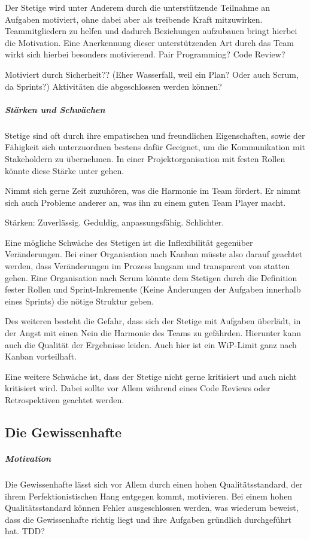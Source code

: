 \documentclass[twocolumn,10pt]{asme2ej}
\begin{document}
Der Stetige wird unter Anderem durch die unterstützende Teilnahme an Aufgaben motiviert, ohne dabei aber als treibende Kraft mitzuwirken. Teammitgliedern zu helfen und dadurch Beziehungen aufzubauen bringt hierbei die Motivation. Eine Anerkennung dieser unterstützenden Art durch das Team wirkt sich hierbei besonders motivierend. Pair Programming? Code Review?	
 

Motiviert durch  Sicherheit?? (Eher Wasserfall, weil ein Plan? Oder auch Scrum, da Sprints?)
Aktivitäten die abgeschlossen werden können? 

\subparagraph{Stärken und Schwächen}

Stetige sind oft durch ihre empatischen und freundlichen Eigenschaften, sowie der Fähigkeit sich unterzuordnen bestens dafür Geeignet, um die Kommunikation mit Stakeholdern zu übernehmen. In einer Projektorganisation mit festen Rollen könnte diese Stärke unter gehen.

Nimmt sich gerne Zeit zuzuhören, was die Harmonie im Team fördert. Er nimmt sich auch Probleme anderer an, was ihn zu einem guten Team Player macht.

Stärken: Zuverlässig. Geduldig, anpassungsfähig. Schlichter. 

Eine mögliche Schwäche des Stetigen ist die Inflexibilität gegenüber Veränderungen. Bei einer Organisation nach Kanban müsste also darauf geachtet werden, dass Veränderungen im Prozess langsam und transparent von statten gehen. Eine Organisation nach Scrum könnte dem Stetigen durch die Definition fester Rollen und Sprint-Inkremente (Keine Änderungen der Aufgaben innerhalb eines Sprints) die nötige Struktur geben.

Des weiteren besteht die Gefahr, dass sich der Stetige mit Aufgaben überlädt, in der Angst mit einen Nein die Harmonie des Teams zu gefährden. Hierunter kann auch die Qualität der Ergebnisse leiden. Auch hier ist ein WiP-Limit ganz nach Kanban vorteilhaft.
 
Eine weitere Schwäche ist, dass der Stetige nicht gerne kritisiert und auch nicht kritisiert wird. Dabei sollte vor Allem während eines Code Reviews oder Retrospektiven geachtet werden.
 


\subsection{Die Gewissenhafte}
\subparagraph{Motivation}

Die Gewissenhafte lässt sich vor Allem durch einen hohen Qualitätsstandard, der ihrem Perfektionistischen Hang entgegen kommt, motivieren. Bei einem hohen Qualitätsstandard können Fehler ausgeschlossen werden, was wiederum beweist, dass die Gewissenhafte richtig liegt und ihre Aufgaben gründlich durchgeführt hat. TDD? 
\end{document}
